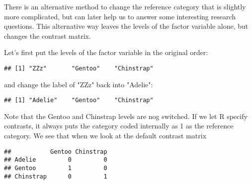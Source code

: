 There is an alternative method to change the reference category that is slightly more complicated, but can later help us to answer some interesting research questions. This alternative way leaves the levels of the factor variable alone, but changes the contrast matrix. 

Let's first put the levels of the factor variable in the original order:

\begin{knitrout}
\color{fgcolor}\begin{kframe}
\begin{alltt}
\hlopt{$} \hlkwb{<-} \hlopt{$}  \hlstd{=} \hlstd{)}
\hlopt{$}
\end{alltt}
\begin{verbatim}
## [1] "ZZz"       "Gentoo"    "Chinstrap"
\end{verbatim}
\end{kframe}
\end{knitrout}

and change the label of "ZZz" back into "Adelie":

\begin{knitrout}
\color{fgcolor}\begin{kframe}
\begin{alltt}
\hlopt{$}\hlstd{species)[}\hlstd{]} \hlkwb{<-} 
\hlopt{$}
\end{alltt}
\begin{verbatim}
## [1] "Adelie"    "Gentoo"    "Chinstrap"
\end{verbatim}
\end{kframe}
\end{knitrout}

Note that the Gentoo and Chinstrap levels are nog switched. If we let R specify contrasts, it always puts the category coded internally as 1 as the reference category. We see that when we look at the default contrast matrix


\begin{knitrout}
\color{fgcolor}\begin{kframe}
\begin{alltt}
\hlopt{$}
\end{alltt}
\begin{verbatim}
##           Gentoo Chinstrap
## Adelie         0         0
## Gentoo         1         0
## Chinstrap      0         1
\end{verbatim}
\end{kframe}
\end{knitrout}

